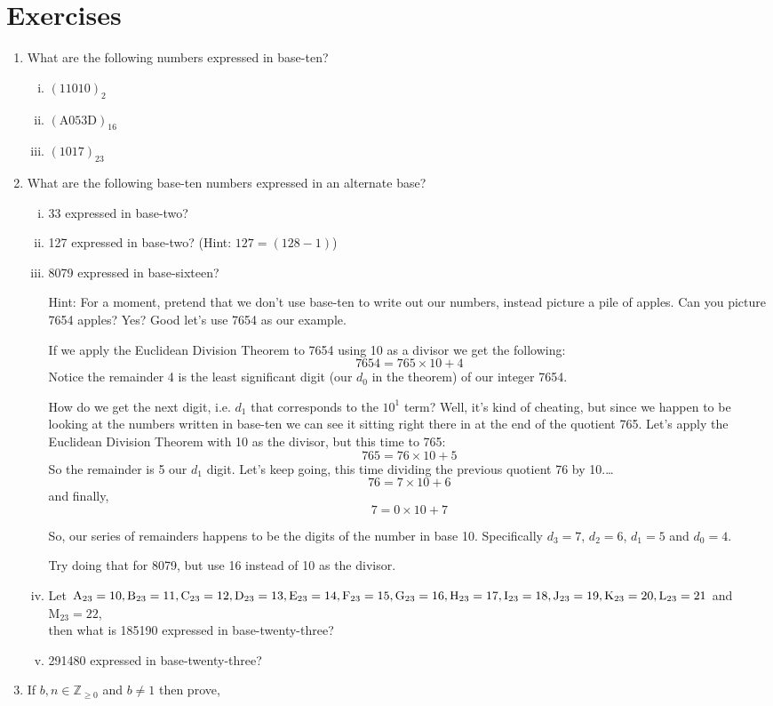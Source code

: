 \documentclass{article}
\begin{document}
\section*{Exercises}
\begin{enumerate}
\item What are the following numbers expressed in base-ten?
\begin{enumerate}[i)]
\item $(11010)_2$
\item $(\text{A}053\text{D})_{16}$
\item $(1017)_{23}$
\end{enumerate}
\item What are the following base-ten numbers expressed in an alternate base?
\begin{enumerate}[i)]
\item 33 expressed in base-two?
\item 127 expressed in base-two? (Hint: $127 = (128-1)$)
\item 8079 expressed in base-sixteen?

Hint: For a moment, pretend that we don't use base-ten to
write out our numbers, instead picture a pile of apples.
Can you picture 7654 apples?  Yes?  Good let's use 7654 as our example.

If we apply the Euclidean Division Theorem to 7654 using 10 as a divisor we get the following:
\[7654 = 765\times{}10+4\]
Notice the remainder 4 is the least significant digit (our $d_0$ in the theorem) of our
integer 7654.

How do we get the next digit, i.e. $d_1$ that corresponds to the $10^1$ term? Well, it’s kind of cheating, but
since we happen to be looking at the numbers written in
base-ten we can see it sitting right there in at the
end of the quotient 765. Let's apply the Euclidean Division Theorem with 10 as the divisor, but
this time to 765:
\[765 = 76\times{}10+5\]
So the remainder is 5 our $d_1$ digit.  Let's keep going, this time dividing the previous quotient 76 by 10.\dots	
\[76 = 7\times{}10+6\]
and finally,
\[7= 0\times{}10+7\]

So, our series of remainders happens to be the digits of the number in base 10.
Specifically $d_3 = 7$, $d_2=6$, $d_1=5$ and $d_0=4$.

Try doing that for 8079, but use 16 instead of 10 as the divisor.
\item Let $\text{A}_{23} = 10, \text{B}_{23} = 11, \text{C}_{23} = 12, \text{D}_{23} = 13, \text{E}_{23} = 14, \text{F}_{23} = 15,
\text{G}_{23} = 16,\\
\text{H}_{23} = 17, \text{I}_{23} = 18, \text{J}_{23} = 19, \text{K}_{23} = 20, \text{L}_{23} = 21$ and $\text{M}_{23} = 22$,\\
then what is 185190 expressed in base-twenty-three?
\item 291480 expressed in base-twenty-three?
\end{enumerate}
\item If $b, n \in \mathbb{Z}_{\ge 0}$ and $b\ne1$ then prove,


\end{enumerate}
\end{document}
